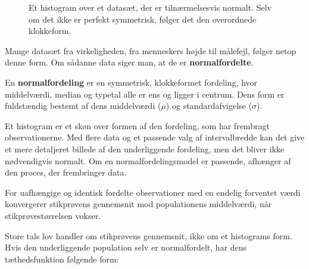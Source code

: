 \begin{figure}[htbp]
    \centering
    \caption{Et histogram over et datasæt, der er tilnærmelsesvis normalt. Selv om det ikke er perfekt symmetrisk, følger det den overordnede klokkeform.}
    \label{fig:approx_normal_hist}
\end{figure}

Mange datasæt fra virkeligheden, fra menneskers højde til målefejl, følger netop denne form. Om sådanne data siger man, at de er \textbf{normalfordelte}.

\begin{definition}[Normalfordeling]
En \textbf{normalfordeling} er en symmetrisk, klokkeformet fordeling, hvor middelværdi, median og typetal alle er ens og ligger i centrum. Dens form er fuldstændig bestemt af dens middelværdi ($\mu$) og standardafvigelse ($\sigma$).
\end{definition}

Et histogram er et skøn over formen af den fordeling, som har frembragt observationerne. Med flere data og et passende valg af intervalbredde kan det give et mere detaljeret billede af den underliggende fordeling, men det bliver ikke nødvendigvis normalt. Om en normalfordelingsmodel er passende, afhænger af den proces, der frembringer data.

\begin{theorem}
    For uafhængige og identisk fordelte observationer med en endelig forventet værdi konvergerer stikprøvens gennemsnit mod populationens middelværdi, når stikprøvestørrelsen vokser.
\end{theorem}

Store tals lov handler om stikprøvens gennemsnit, ikke om et histograms form. Hvis den underliggende population selv er normalfordelt, har dens tæthedsfunktion følgende form:

